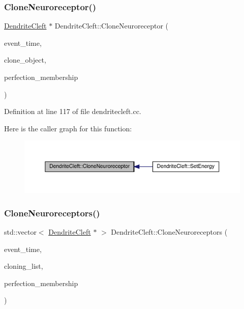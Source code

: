 \subsubsection{\texorpdfstring{Clone\+Neuroreceptor()}{CloneNeuroreceptor()}}
{\footnotesize\ttfamily \hyperlink{class_dendrite_cleft}{Dendrite\+Cleft} $\ast$ Dendrite\+Cleft\+::\+Clone\+Neuroreceptor (\begin{DoxyParamCaption}\item[{std\+::chrono\+::time\+\_\+point$<$ \hyperlink{universe_8h_a0ef8d951d1ca5ab3cfaf7ab4c7a6fd80}{Clock} $>$}]{event\+\_\+time,  }\item[{\hyperlink{class_dendrite_cleft}{Dendrite\+Cleft} $\ast$}]{clone\+\_\+object,  }\item[{double}]{perfection\+\_\+membership }\end{DoxyParamCaption})}



Definition at line 117 of file dendritecleft.\+cc.

Here is the caller graph for this function\+:\nopagebreak
\begin{figure}[H]
\begin{center}
\leavevmode
\includegraphics[width=350pt]{class_dendrite_cleft_a7650e1115baab30729da0b03a48da851_icgraph}
\end{center}
\end{figure}
\mbox{\label{class_dendrite_cleft_a93b542418482f3732380e33346e23bd2}} 
\subsubsection{\texorpdfstring{Clone\+Neuroreceptors()}{CloneNeuroreceptors()}}
{\footnotesize\ttfamily std\+::vector$<$ \hyperlink{class_dendrite_cleft}{Dendrite\+Cleft} $\ast$ $>$ Dendrite\+Cleft\+::\+Clone\+Neuroreceptors (\begin{DoxyParamCaption}\item[{std\+::chrono\+::time\+\_\+point$<$ \hyperlink{universe_8h_a0ef8d951d1ca5ab3cfaf7ab4c7a6fd80}{Clock} $>$}]{event\+\_\+time,  }\item[{std\+::vector$<$ \hyperlink{class_dendrite_cleft}{Dendrite\+Cleft} $\ast$$>$}]{cloning\+\_\+list,  }\item[{double}]{perfection\+\_\+membership }\end{DoxyParamCaption})}



